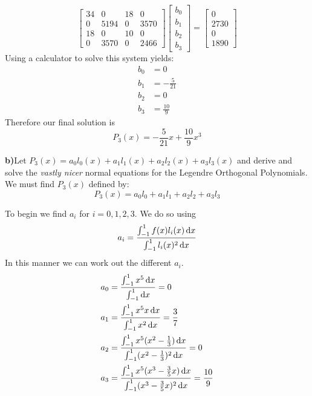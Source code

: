 \documentclass{scrartcl}
\begin{document}
\begin{displaymath}
\begin{bmatrix}
34 & 0 & 18 & 0\\
0 & 5194 & 0 & 3570\\
18 & 0 & 10 & 0\\
0 & 3570 & 0 & 2466 
\end{bmatrix}
\begin{bmatrix}
b_0\\
b_1\\
b_2\\
b_3
\end{bmatrix}
= \begin{bmatrix}
0\\
2730\\
0\\
1890
\end{bmatrix}
\end{displaymath}
Using a calculator to solve this system yields:
\begin{align*}
b_0&=0\\
b_1&=-\frac{5}{21}\\
b_2&=0\\
b_3&=\frac{10}{9}
\end{align*}
Therefore our final solution is
\begin{displaymath}
P_3(x)=-\frac{5}{21}x+\frac{10}{9}x^3
\end{displaymath}\pagebreak

\textbf{b)}Let $P_3(x)=a_0l_0(x)+a_1l_1(x)+a_2l_2(x)+a_3l_3(x)$ and derive and solve the \emph{vastly nicer} normal equations for the Legendre Orthogonal Polynomials.\\

We must find $P_3(x)$ defined by:
\begin{displaymath}
P_3(x)=a_0l_0+a_1l_1+a_2l_2+a_3l_3
\end{displaymath}

To begin we find $a_i$ for $i=0,1,2,3$. We do so using
\begin{displaymath}
a_i=\frac{\int_{-1}^1f(x)l_i(x)\dif{x}}{\int_{-1}^1l_i(x)^2\dif{x}}
\end{displaymath}
In this manner we can work out the different $a_i$.
\begin{align*}
a_0 &= \frac{\int_{-1}^1x^5\dif{x}}{\int_{-1}^1\dif{x}} = 0\\
a_1 &= \frac{\int_{-1}^1x^5x\dif{x}}{\int_{-1}^1x^2\dif{x}} = \frac{3}{7}\\
a_2 &= \frac{\int_{-1}^1x^5(x^2-\frac{1}{3})\dif{x}}{\int_{-1}^1(x^2-\frac{1}{3})^2\dif{x}} = 0\\
a_3 &= \frac{\int_{-1}^1x^5(x^3-\frac{3}{5}x)\dif{x}}{\int_{-1}^1(x^3-\frac{3}{5}x)^2\dif{x}} = \frac{10}{9}
\end{align*}
\end{document}
